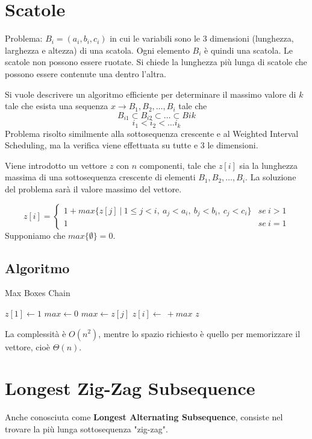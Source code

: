 \section{Scatole}
Problema: $B_i = (a_i, b_i, c_i)$ in cui le variabili sono le 3 dimensioni (lunghezza, larghezza e altezza) di una scatola. Ogni elemento $B_i$ è quindi una scatola. Le scatole non possono essere ruotate. Si chiede la lunghezza più lunga di scatole che possono essere contenute una dentro l'altra.

Si vuole descrivere un algoritmo efficiente per determinare il massimo valore di $k$ tale che esista una sequenza $x \rightarrow B_1, B_2, \dots, B_i$ tale che
$$B_{i1} \subset B_{i2} \subset \dots \subset B{ik}$$
$$i_1 < i_2 < \dots i_k$$
Problema risolto similmente alla sottosequenza crescente e al Weighted Interval Scheduling, ma la verifica viene effettuata su tutte e 3 le dimensioni.

Viene introdotto un vettore $z$ con $n$ componenti, tale che $z[i]$ sia la lunghezza massima di una sottosequenza crescente di elementi $B_1, B_2, \dots, B_i$. La soluzione del problema sarà il valore massimo del vettore.

$$z[i] =
\begin{cases}
1 + max\{z[j]\ |\ 1 \leq j < i,\ a_j < a_i,\ b_j < b_i,\  c_j < c_i\}  & se\ i > 1 \\
1 & se\ i = 1
\end{cases}$$
Supponiamo che $max\{\emptyset\} = 0$.

\subsection{Algoritmo}
\begin{algorithm}[H]
	\caption{Max Boxes Chain}
	\begin{algorithmic}
			\State $z[1] \gets 1$
				\State $max \gets 0$
							\State $max \gets z[j]$
						\EndIf
					\EndFor
				\State $z[i] \gets \ + max$
			\EndFor
			\State \Return $z$
		\EndFunction
	\end{algorithmic}
\end{algorithm}
La complessità è $O(n^2)$, mentre lo spazio richiesto è quello per memorizzare il vettore, cioè $\Theta(n)$.


\section{Longest Zig-Zag Subsequence}
Anche conosciuta come \textbf{Longest Alternating Subsequence}, consiste nel trovare la più lunga sottosequenza "zig-zag".

